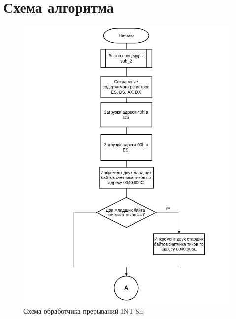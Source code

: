 
\section*{Схема алгоритма} 

\begin{figure}[h!]
	\begin{center}
		\includegraphics[scale=0.6]{img/int8h_1}
	\end{center}
	\captionsetup{justification=centering}
	\caption{Схема обработчика прерываний INT 8h}
	\label{img:s1}
\end{figure}

